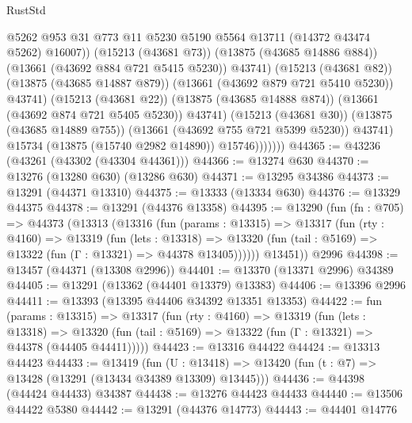 \begin{lexlean}{RustStd}
\begin{coremodule}
                              @5262
                              @953
                              @31
                              @773
                              @11
                              @5230
                              @5190
                              @5564
                              @13711
                              (@14372 @43474 @5262)
                              @16007))
                          (@15213 (@43681 @73))
                          (@13875 (@43685 @14886 @884))
                          (@13661 (@43692 @884 @721 @5415 @5230))
                          @43741)
                        (@15213 (@43681 @82))
                        (@13875 (@43685 @14887 @879))
                        (@13661 (@43692 @879 @721 @5410 @5230))
                        @43741)
                      (@15213 (@43681 @22))
                      (@13875 (@43685 @14888 @874))
                      (@13661 (@43692 @874 @721 @5405 @5230))
                      @43741)
                    (@15213 (@43681 @30))
                    (@13875 (@43685 @14889 @755))
                    (@13661 (@43692 @755 @721 @5399 @5230))
                    @43741)
                  @15734
                  (@13875 (@15740 @2982 @14890))
                  @15746)))))))
@44365 := @43236 (@43261 (@43302 (@43304 @44361)))
@44366 := @13274 @630
@44370 := @13276 (@13280 @630) (@13286 @630)
@44371 := @13295 @34386
@44373 := @13291 (@44371 @13310)
@44375 := @13333 (@13334 @630)
@44376 := @13329 @44375
@44378 := @13291 (@44376 @13358)
@44395 := @13290
    (fun (fn : @705) =>
    @44373
      (@13313
        (@13316
          (fun (params : @13315) =>
          @13317
            (fun (rty : @4160) =>
            @13319
              (fun (lets : @13318) =>
              @13320 (fun (tail : @5169) => @13322 (fun (Γ : @13321) => @44378 @13405))))))
        @13451))
    @2996
@44398 := @13457 (@44371 (@13308 @2996))
@44401 := @13370 (@13371 @2996) @34389
@44405 := @13291 (@13362 (@44401 @13379) @13383)
@44406 := @13396 @2996
@44411 := @13393 (@13395 @44406 @34392 @13351 @13353)
@44422 := fun (params : @13315) =>
  @13317
    (fun (rty : @4160) =>
    @13319
      (fun (lets : @13318) =>
      @13320 (fun (tail : @5169) => @13322 (fun (Γ : @13321) => @44378 (@44405 @44411)))))
@44423 := @13316 @44422
@44424 := @13313 @44423
@44433 := @13419
    (fun (U : @13418) => @13420 (fun (t : @7) => @13428 (@13291 (@13434 @34389 @13309) @13445)))
@44436 := @44398 (@44424 @44433) @34387
@44438 := @13276 @44423 @44433
@44440 := @13506 @44422 @5380
@44442 := @13291 (@44376 @14773)
@44443 := @44401 @14776

\end{coremodule}
\end{lexlean}
